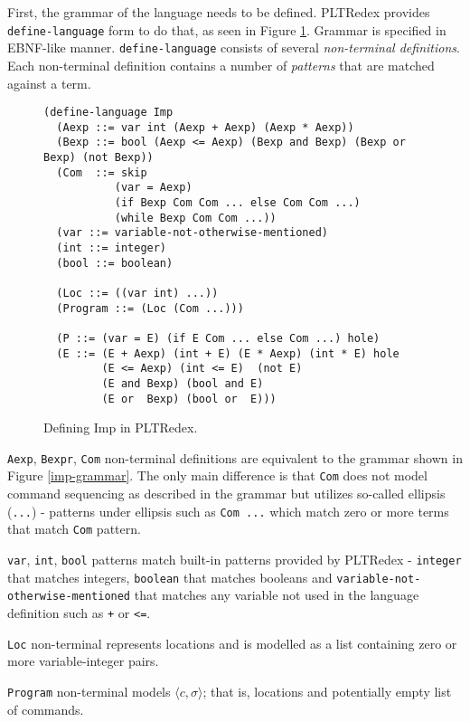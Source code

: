 First, the grammar of the language needs to be defined. PLTRedex provides \texttt{define-language} form to do that, as seen in Figure \ref{imp-define-language}. Grammar is specified in EBNF-like manner. \texttt{define-language} consists of several \textit{non-terminal definitions}. Each non-terminal definition contains a number of \textit{patterns} that are matched against a term. 

\begin{figure}[H]
\begin{verbatim}
(define-language Imp
  (Aexp ::= var int (Aexp + Aexp) (Aexp * Aexp))
  (Bexp ::= bool (Aexp <= Aexp) (Bexp and Bexp) (Bexp or Bexp) (not Bexp))
  (Com  ::= skip
           (var = Aexp)
           (if Bexp Com Com ... else Com Com ...)
           (while Bexp Com Com ...))
  (var ::= variable-not-otherwise-mentioned)
  (int ::= integer)
  (bool ::= boolean) 

  (Loc ::= ((var int) ...))
  (Program ::= (Loc (Com ...)))

  (P ::= (var = E) (if E Com ... else Com ...) hole)
  (E ::= (E + Aexp) (int + E) (E * Aexp) (int * E) hole 
         (E <= Aexp) (int <= E)  (not E)     
         (E and Bexp) (bool and E)
         (E or  Bexp) (bool or  E)))
\end{verbatim}
\caption{Defining Imp in PLTRedex.}
\label{imp-define-language}
\end{figure}


\texttt{Aexp}, \texttt{Bexpr}, \texttt{Com} non-terminal definitions are equivalent to the grammar shown in Figure \ref{imp-grammar}. The only main difference is that \texttt{Com} does not model command sequencing as described in the grammar but utilizes so-called ellipsis (\texttt{...}) - patterns under ellipsis such as \texttt{Com ...} which match zero or more terms that match \texttt{Com} pattern.

\texttt{var}, \texttt{int}, \texttt{bool} patterns match built-in patterns provided by PLTRedex - \texttt{integer} that matches integers, \texttt{boolean} that matches booleans and \texttt{variable-not-otherwise-mentioned} that matches any variable not used in the language definition such as \texttt{+} or \texttt{<=}.

\texttt{Loc} non-terminal represents locations and is modelled as a list containing zero or more variable-integer pairs.

\texttt{Program} non-terminal models $\langle c, \sigma \rangle$; that is, locations and potentially empty list of commands.

